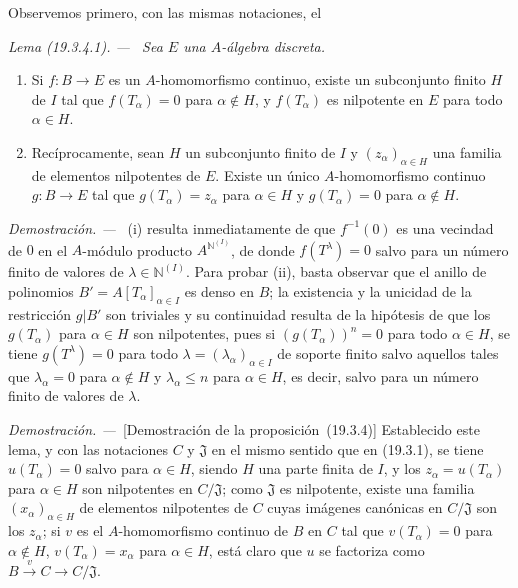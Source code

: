 \documentclass[10pt,oneside]{book}
\makeatletter
\newcommand{\setmanualcurrentlabel}[1]{\def\@currentlabel{#1}}
\newcommand{\oldpage}[2][]{%
  \setcounter{footnote}{0}%
  \marginpar{\scriptsize\textbf{#1}~|~#2}\ignorespaces}
\newenvironment{lemma}[1][]{%
  \setmanualcurrentlabel{#1}\par\medskip\noindent\itshape Lema (#1). ---\ }{\par}
\newenvironment{proof}{%
  \par\medskip\noindent\textit{Demostración. ---\ }}{\par}
\makeatother
\begin{document}
Observemos primero, con las mismas notaciones, el
\begin{lemma}[19.3.4.1]
\label{0.19.3.4.1-es}
Sea $E$ una $A$-álgebra discreta.
\begin{enumerate}
  \item[\textup{(i)}] Si $f:B\to E$ es un $A$-homomorfismo continuo, existe un
  subconjunto finito $H$ de $I$ tal que $f(T_\alpha)=0$ para $\alpha\notin H$,
  y $f(T_\alpha)$ es nilpotente en $E$ para todo $\alpha\in H$.
  \item[\textup{(ii)}] Recíprocamente, sean $H$ un subconjunto finito de $I$ y
  $(z_\alpha)_{\alpha\in H}$ una familia de elementos nilpotentes de $E$.
  Existe un único $A$-homomorfismo continuo $g:B\to E$ tal que
  $g(T_\alpha)=z_\alpha$ para $\alpha\in H$ y
  $g(T_\alpha)=0$ para $\alpha\notin H$.
\end{enumerate}
\end{lemma}

\oldpage[0\textsubscript{IV-1}]{81}

\begin{proof}
(i) resulta inmediatamente de que $f^{-1}(0)$ es una vecindad de $0$ en el
$A$-módulo producto $A^{\mathbb{N}^{(I)}}$, de donde $f(T^\lambda)=0$ salvo para un
número finito de valores de $\lambda\in\mathbb{N}^{(I)}$. Para probar (ii),
basta observar que el anillo de polinomios
$B'=A[T_\alpha]_{\alpha\in I}$ es denso en $B$; la existencia y
la unicidad de la restricción $g|B'$ son triviales y su continuidad resulta de
la hipótesis de que los $g(T_\alpha)$ para $\alpha\in H$ son nilpotentes,
pues si $(g(T_\alpha))^n=0$ para todo $\alpha\in H$, se tiene
$g(T^\lambda)=0$ para todo $\lambda=(\lambda_\alpha)_{\alpha\in I}$ de
soporte finito salvo aquellos tales que $\lambda_\alpha=0$ para
$\alpha\notin H$ y $\lambda_\alpha\leq n$ para
$\alpha\in H$, es decir, salvo para un número finito de valores de
$\lambda$.
\end{proof}

\begin{proof}[Demostración de la proposición~{\rm(19.3.4)}]
Establecido este lema, y con las notaciones $C$ y $\mathfrak J$ en el mismo
sentido que en (19.3.1), se tiene $u(T_\alpha)=0$ salvo para
$\alpha\in H$, siendo $H$ una parte finita de $I$, y los
$z_\alpha=u(T_\alpha)$ para $\alpha\in H$ son nilpotentes en
$C/\mathfrak J$; como $\mathfrak J$ es nilpotente, existe una familia
$(x_\alpha)_{\alpha\in H}$ de elementos nilpotentes de $C$ cuyas imágenes
canónicas en $C/\mathfrak J$ son los $z_\alpha$; si $v$ es el
$A$-homomorfismo continuo de $B$ en $C$ tal que
$v(T_\alpha)=0$ para $\alpha\notin H$, $v(T_\alpha)=x_\alpha$ para
$\alpha\in H$, está claro que $u$ se factoriza como
$B\xrightarrow{v}C\to C/\mathfrak J$.
\end{proof}
\end{document}
